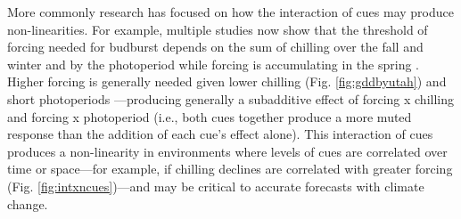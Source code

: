 \documentclass[11pt,letter]{article}
\begin{document}
More commonly research has focused on how the interaction of cues may produce non-linearities. For example, multiple studies now show that the threshold of forcing needed for budburst depends on the sum of chilling over the fall and winter and by the photoperiod while forcing is accumulating in the spring \citep[e.g.,][]{zohner2014,flynn2018}. Higher forcing is generally needed given lower chilling (Fig. \ref{fig:gddbyutah}) and short photoperiods \citep{Basler:2014aa,fu2019}---producing generally a subadditive effect of forcing x chilling and forcing x photoperiod (i.e., both cues together produce a more muted response than the addition of each cue's effect alone). This interaction of cues produces a non-linearity in environments where levels of cues are correlated over time or space---for example, if chilling declines are correlated with greater forcing (Fig. \ref{fig:intxncues})---and may be critical to accurate forecasts with climate change. \\ %

\end{document}

